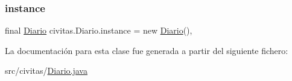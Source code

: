\mbox{\label{classcivitas_1_1Diario_ae37b0fcc0069768cbc49cf6aedeaffff}} 
\subsubsection{\texorpdfstring{instance}{instance}}
{\footnotesize\ttfamily final \hyperlink{classcivitas_1_1Diario}{Diario} civitas.\+Diario.\+instance = new \hyperlink{classcivitas_1_1Diario}{Diario}()\hspace{0.3cm}{\ttfamily [static]}, {\ttfamily [private]}}



La documentación para esta clase fue generada a partir del siguiente fichero\+:\begin{DoxyCompactItemize}
\item 
src/civitas/\hyperlink{Diario_8java}{Diario.\+java}\end{DoxyCompactItemize}
